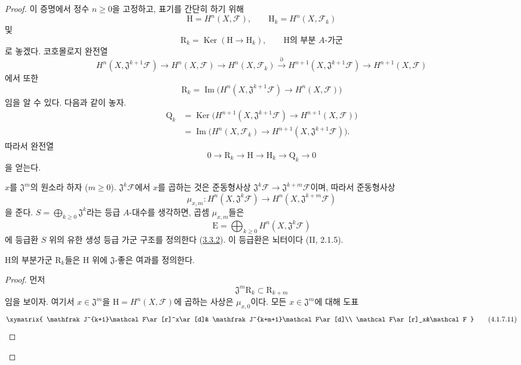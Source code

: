 \begin{proof}
이 증명에서 정수 $n\geq0$을 고정하고, 표기를 간단히 하기 위해
\[
\mathrm H=H^n(X,\mathcal F),\qquad
\mathrm H_k=H^n(X,\mathcal F_k)
\tag{4.1.7.3}\label{III.4.1.7.3-fr}
\]
및
\[
\mathrm R_k=\operatorname{Ker}(\mathrm H\longrightarrow\mathrm H_k),
\qquad\text{$\mathrm H$의 부분 $A$-가군}
\tag{4.1.7.4}\label{III.4.1.7.4-fr}
\]
로 놓겠다. 코호몰로지 완전열
\[
H^n(X,\mathfrak J^{k+1}\mathcal F)\longrightarrow H^n(X,\mathcal F)
\longrightarrow H^n(X,\mathcal F_k)\xrightarrow{\partial}
H^{n+1}(X,\mathfrak J^{k+1}\mathcal F)
\longrightarrow H^{n+1}(X,\mathcal F)
\]
에서 또한
\[
\mathrm R_k=\operatorname{Im}\bigl(
H^n(X,\mathfrak J^{k+1}\mathcal F)\longrightarrow H^n(X,\mathcal F)
\bigr)
\]
임을 알 수 있다. 다음과 같이 놓자.
\[
\begin{aligned}
\mathrm Q_k
&=\operatorname{Ker}\bigl(H^{n+1}(X,\mathfrak J^{k+1}\mathcal F)
\longrightarrow H^{n+1}(X,\mathcal F)\bigr)\\
&=\operatorname{Im}\bigl(H^n(X,\mathcal F_k)
\longrightarrow H^{n+1}(X,\mathfrak J^{k+1}\mathcal F)\bigr).
\end{aligned}
\tag{4.1.7.5}\label{III.4.1.7.5-fr}
\]
따라서 완전열
\[
0\longrightarrow\mathrm R_k\longrightarrow\mathrm H
\longrightarrow\mathrm H_k\longrightarrow\mathrm Q_k\longrightarrow0
\tag{4.1.7.6}\label{III.4.1.7.6-fr}
\]
을 얻는다.

\begin{env}[4.1.7.7]
\label{III.4.1.7.7-fr}
$x$를 $\mathfrak J^m$의 원소라 하자 ($m\geq0$).
$\mathfrak J^k\mathcal F$에서 $x$를 곱하는 것은 준동형사상
$\mathfrak J^k\mathcal F\to\mathfrak J^{k+m}\mathcal F$이며, 따라서
준동형사상
\[
\mu_{x,m}:H^n(X,\mathfrak J^k\mathcal F)
\longrightarrow H^n(X,\mathfrak J^{k+m}\mathcal F)
\tag{4.1.7.8}\label{III.4.1.7.8-fr}
\]
을 준다. $S=\bigoplus_{k\geq0}\mathfrak J^k$라는 등급 $A$-대수를
생각하면, 곱셈 $\mu_{x,m}$들은
\[
\mathrm E=\bigoplus_{k\geq0}H^n(X,\mathfrak J^k\mathcal F)
\]
에 등급환 $S$ 위의 유한 생성 등급 가군 구조를 정의한다
(\hyperref[III.3.3.2-fr]{3.3.2}). 이 등급환은 뇌터이다
(II, 2.1.5).
\end{env}

\begin{lemma}[4.1.7.9]
\label{III.4.1.7.9-fr}
$\mathrm H$의 부분가군 $\mathrm R_k$들은 $\mathrm H$ 위에
$\mathfrak J$-좋은 여과를 정의한다.
\end{lemma}

\begin{proof}
먼저
\[
\mathfrak J^m\mathrm R_k\subset\mathrm R_{k+m}
\tag{4.1.7.10}\label{III.4.1.7.10-fr}
\]
임을 보이자. 여기서 $x\in\mathfrak J^m$을
$\mathrm H=H^n(X,\mathcal F)$에 곱하는 사상은 $\mu_{x,0}$이다. 모든
$x\in\mathfrak J^m$에 대해 도표
\[
\xymatrix{
\mathfrak J^{k+1}\mathcal F\ar[r]^x\ar[d]&
\mathfrak J^{k+m+1}\mathcal F\ar[d]\\
\mathcal F\ar[r]_x&\mathcal F
}
\tag{4.1.7.11}\label{III.4.1.7.11-fr}
\]


\end{proof}
\end{proof}
